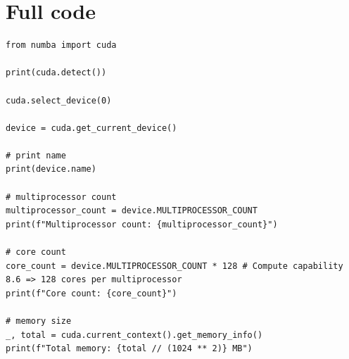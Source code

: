 \documentclass{article}
\begin{document}
\section{Full code}
\begin{lstlisting}
from numba import cuda

print(cuda.detect())

cuda.select_device(0)

device = cuda.get_current_device()

# print name
print(device.name)

# multiprocessor count
multiprocessor_count = device.MULTIPROCESSOR_COUNT
print(f"Multiprocessor count: {multiprocessor_count}")

# core count
core_count = device.MULTIPROCESSOR_COUNT * 128 # Compute capability 8.6 => 128 cores per multiprocessor
print(f"Core count: {core_count}")

# memory size
_, total = cuda.current_context().get_memory_info()
print(f"Total memory: {total // (1024 ** 2)} MB")
\end{lstlisting}
\end{document}
